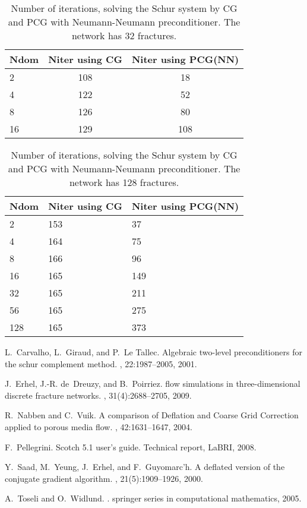 \documentclass{report}
\begin{document}
\begin{table}[h]
\begin{tabular}{|l|c|c|}
\hline
Ndom & Niter using CG & Niter using PCG(NN) \\ \hline
2 & 108 & 18 \\ \hline
4 & 122 & 52 \\ \hline
8 & 126 & 80 \\ \hline
16 & 129 & 108 \\ \hline
\end{tabular}
\caption{\label{tab:NN1} Number of iterations, solving the Schur system
by CG and PCG with Neumann-Neumann preconditioner. The network has 32
fractures.}
\end{table}
\begin{table}[h]
\begin{tabular}{|l|l|l|}
\hline
Ndom & Niter using CG & Niter using PCG(NN) \\ \hline
2 & 153 & 37 \\
\hline
4 & 164 & 75 \\
\hline
8 & 166 & 96 \\
\hline
16 & 165 & 149 \\
\hline
32 & 165 & 211 \\
\hline
56 & 165 & 275 \\
\hline
128 & 165 & 373 \\
\hline
\end{tabular}
\caption{\label{tab:NN2}Number of iterations, solving the Schur system by
CG and PCG with Neumann-Neumann preconditioner. The network has 128
fractures.}
\end{table}

\begin{thebibliography}{1}

L.~Carvalho, L.~Giraud, and P.~Le Tallec.
\newblock Algebraic two-level preconditioners for the schur complement method.
, 22:1987--2005, 2001.

J.~Erhel, J.-R. de~Dreuzy, and B.~Poirriez.
\newblock flow simulations in three-dimensional discrete fracture networks.
, 31(4):2688--2705, 2009.

R.~Nabben and C.~Vuik.
\newblock A comparison of {D}eflation and {C}oarse {G}rid {C}orrection applied
to porous media flow.
, 42:1631--1647, 2004.

F.~Pellegrini.
\newblock Scotch 5.1 user's guide.
\newblock Technical report, LaBRI, 2008.

Y.~Saad, M.~Yeung, J.~Erhel, and F.~Guyomarc'h.
\newblock A deflated version of the conjugate gradient algorithm.
, 21(5):1909--1926, 2000.

A.~Toseli and O.~Widlund.
.
\newblock springer series in computational mathematics, 2005.

\end{thebibliography}
\end{document}
